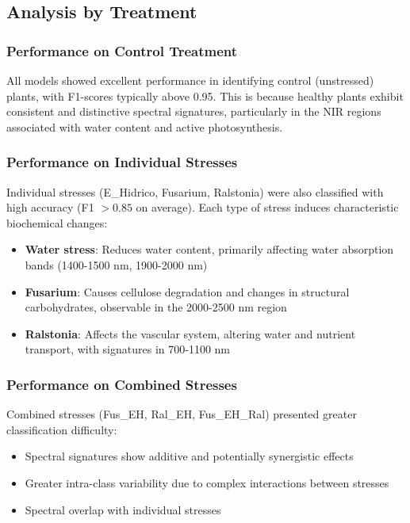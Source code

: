 \documentclass[12pt,a4paper]{article}
\begin{document}
\subsection{Analysis by Treatment}

\subsubsection{Performance on Control Treatment}

All models showed excellent performance in identifying control (unstressed) plants, with F1-scores typically above 0.95. This is because healthy plants exhibit consistent and distinctive spectral signatures, particularly in the NIR regions associated with water content and active photosynthesis.

\subsubsection{Performance on Individual Stresses}

Individual stresses (E\_Hidrico, Fusarium, Ralstonia) were also classified with high accuracy (F1 $> 0.85$ on average). Each type of stress induces characteristic biochemical changes:

\begin{itemize}
    \item \textbf{Water stress}: Reduces water content, primarily affecting water absorption bands (1400-1500 nm, 1900-2000 nm)
    \item \textbf{Fusarium}: Causes cellulose degradation and changes in structural carbohydrates, observable in the 2000-2500 nm region
    \item \textbf{Ralstonia}: Affects the vascular system, altering water and nutrient transport, with signatures in 700-1100 nm
\end{itemize}

\subsubsection{Performance on Combined Stresses}

Combined stresses (Fus\_EH, Ral\_EH, Fus\_EH\_Ral) presented greater classification difficulty:

\begin{itemize}
    \item Spectral signatures show additive and potentially synergistic effects
    \item Greater intra-class variability due to complex interactions between stresses
    \item Spectral overlap with individual stresses
\end{itemize}
\end{document}
